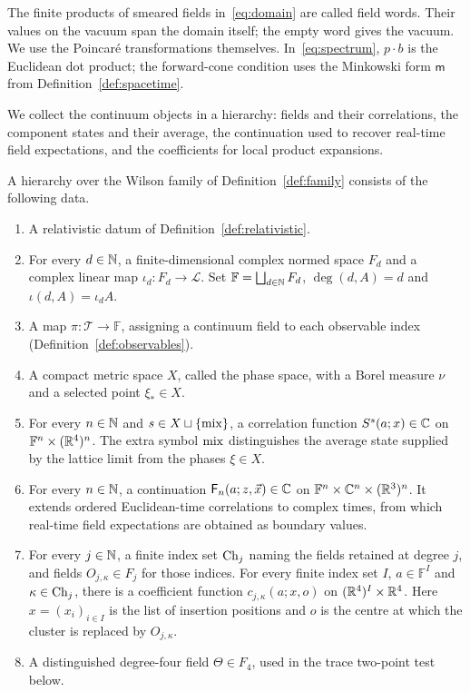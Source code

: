 The finite products of smeared fields in~\eqref{eq:domain} are called field words.
Their values on the vacuum span the domain itself; the empty word gives the vacuum.
We use the Poincar\'e transformations themselves.
In~\eqref{eq:spectrum}, $p\cdot b$ is the Euclidean dot product; the forward-cone condition uses the Minkowski form $\mathsf m$ from Definition~\ref{def:spacetime}.

We collect the continuum objects in a hierarchy: fields and their correlations, the component states and their average, the continuation used to recover real-time field expectations, and the coefficients for local product expansions.

\begin{definition}[Hierarchy]\label{def:hierarchy}
A hierarchy over the Wilson family of Definition~\ref{def:family} consists of the following data.
\begin{enumerate}[label=\textup{H\arabic*.},ref=H\arabic*]
\item\label{hierarchy:1} A relativistic datum of Definition~\ref{def:relativistic}.
\item\label{hierarchy:2} For every $d\in\mathbb N$, a finite-dimensional complex normed space $F_d$ and a complex linear map $\iota_d:F_d\to\mathcal L$.
Set $\mathbb F=\bigsqcup_{d\in\mathbb N}F_d$, $\deg(d,A)=d$ and $\iota(d,A)=\iota_d A$.
\item\label{hierarchy:3} A map $\pi:\mathcal T\to\mathbb F$, assigning a continuum field to each observable index (Definition~\ref{def:observables}).
\item\label{hierarchy:4} A compact metric space $X$, called the phase space, with a Borel measure $\nu$ and a selected point $\xi_*\in X$.
\item\label{hierarchy:5} For every $n\in\mathbb N$ and $s\in X\sqcup\{\mathrm{mix}\}$, a correlation function $S^s(a;x)\in\mathbb C$ on $\mathbb F^n\times(\mathbb R^4)^n$.
The extra symbol $\mathrm{mix}$ distinguishes the average state supplied by the lattice limit from the phases $\xi\in X$.
\item\label{hierarchy:6} For every $n\in\mathbb N$, a continuation $\mathsf F_n(a;z,\vec x)\in\mathbb C$ on $\mathbb F^n\times\mathbb C^n\times(\mathbb R^3)^n$. It extends ordered Euclidean-time correlations to complex times, from which real-time field expectations are obtained as boundary values.
\item\label{hierarchy:7} For every $j\in\mathbb N$, a finite index set $\operatorname{Ch}_{j}$ naming the fields retained at degree $j$, and fields $O_{j,\kappa}\in F_j$ for those indices.
For every finite index set $I$, $a\in\mathbb F^I$ and $\kappa\in\operatorname{Ch}_{j}$, there is a coefficient function $c_{j,\kappa}(a;x,o)$ on $(\mathbb R^4)^I\times\mathbb R^4$.
Here $x=(x_i)_{i\in I}$ is the list of insertion positions and $o$ is the centre at which the cluster is replaced by $O_{j,\kappa}$.
\item\label{hierarchy:8} A distinguished degree-four field $\Theta\in F_4$, used in the trace two-point test below.
\end{enumerate}
\end{definition}

